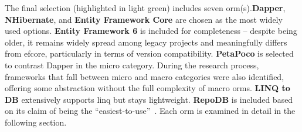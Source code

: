 The final selection (highlighted in light green) includes seven \acrshort{orm}(s).\textbf{Dapper}, \textbf{NHibernate}, and \textbf{Entity Framework Core} are chosen as the most widely used options. \textbf{Entity Framework 6} is included for completeness -- despite being older, it remains widely spread among legacy projects and meaningfully differs from \acrshort{efcore}, particularly in terms of version compatibility. \textbf{PetaPoco} is selected to contrast Dapper in the micro category. During the research process, frameworks that fall between micro and macro categories were also identified, offering some abstraction without the full complexity of macro \acrshort{orm}s. \textbf{LINQ to DB} extensively supports \acrshort{linq} but stays lightweight. \textbf{RepoDB} is included based on its claim of being the ``easiest-to-use''~\cite{RepoDB}. Each \acrshort{orm} is examined in detail in the following section.